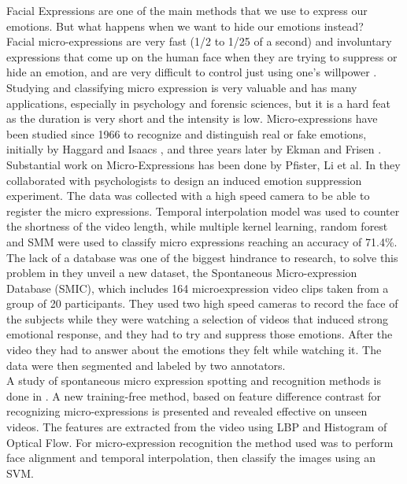 Facial Expressions are one of the main methods that we use to express our emotions. But what happens when we want to hide our emotions instead? \\
Facial micro-expressions are very fast (1/2 to 1/25 of a second) and involuntary expressions that come up on the human face when they are trying to suppress or hide an emotion, and are very difficult to control just using one's willpower \cite{EkmanER}. 
Studying and classifying micro expression is very valuable and has many applications, especially in psychology and forensic sciences, but it is a hard feat as the duration is very short and the intensity is low. 
Micro-expressions have been studied since 1966 to recognize and distinguish real or fake emotions, initially by Haggard and Isaacs \cite{Haggard}, and three years later by Ekman and Frisen \cite{EkmanLeakage}. \\
Substantial work on Micro-Expressions has been done by Pfister, Li et al. In \cite{pfister2011micro} they collaborated with psychologists to design an induced emotion suppression experiment. The data was collected with a high speed camera to be able to register the micro expressions. Temporal interpolation model was used to counter the shortness of the video length, while multiple kernel learning, random forest and SMM were used to classify micro expressions reaching an accuracy of 71.4\%. \\
The lack of a database was one of the biggest hindrance to research, to solve this problem in \cite{xli2012spontaneous} they unveil a new dataset, the Spontaneous Micro-expression Database (SMIC), which includes 164 microexpression video clips taken from a group of 20 participants. They used two high speed cameras to record the face of the subjects while they were watching a selection of videos that induced strong emotional response, and they had to try and suppress those emotions. After the video they had to answer about the emotions they felt while watching it. The data were then segmented and labeled by two annotators. \\
A study of spontaneous micro expression spotting and recognition methods is done in \cite{xli2015reading}. A new training-free method, based on feature difference contrast for recognizing micro-expressions is presented and revealed effective on unseen videos.
The features are extracted from the video using LBP and Histogram of Optical Flow. 
For micro-expression recognition the method used was to perform face alignment and temporal interpolation, then classify the images using an SVM. 
